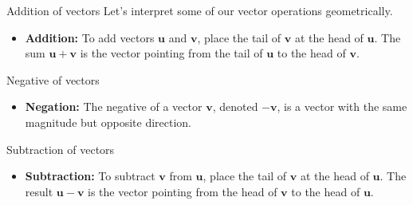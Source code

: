 \documentclass{beamer}
\begin{document}
\begin{frame}{Addition of vectors}
Let's interpret some of our vector operations geometrically.

    \begin{itemize}
      \item \textbf{Addition:} To add vectors $\mathbf{u}$ and $\mathbf{v}$, place the tail of $\mathbf{v}$ at the head of $\mathbf{u}$. The sum $\mathbf{u} + \mathbf{v}$ is the vector pointing from the tail of $\mathbf{u}$ to the head of $\mathbf{v}$.
    \end{itemize}

    \begin{center}
    \end{center}

\end{frame}


\begin{frame}{Negative of vectors}
    \begin{itemize}
      \item \textbf{Negation:} The negative of a vector $\mathbf{v}$, denoted $-\mathbf{v}$, is a vector with the same magnitude but opposite direction.
    \end{itemize}

    \begin{center}
    \end{center}

\end{frame}


\begin{frame}{Subtraction of vectors}
    \begin{itemize}
      \item \textbf{Subtraction:} To subtract $\mathbf{v}$ from $\mathbf{u}$, place the tail of $\mathbf{v}$ at the head of $\mathbf{u}$. The result $\mathbf{u} - \mathbf{v}$ is the vector pointing from the head of $\mathbf{v}$ to the head of $\mathbf{u}$.
    \end{itemize}

    \begin{center}
    \end{center}
\end{frame}
\end{document}

